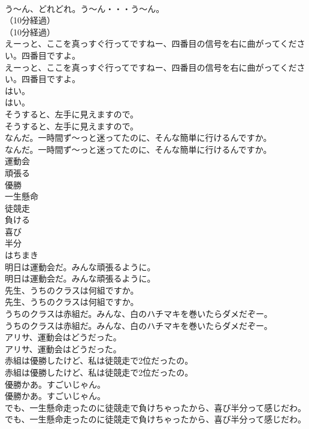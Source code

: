 \documentclass[8pt]{extreport}
\begin{document}
\begin{CJK}{UTF8}{min}
\\	う〜ん、どれどれ。う〜ん・・・う〜ん。 
\\	（10分経過）	
\\	（10分経過） 
\\	えーっと、ここを真っすぐ行ってですねー、四番目の信号を右に曲がってください。四番目ですよ。	
\\	えーっと、ここを真っすぐ行ってですねー、四番目の信号を右に曲がってください。四番目ですよ。 
\\	はい。	
\\	はい。 
\\	そうすると、左手に見えますので。	
\\	そうすると、左手に見えますので。 
\\	なんだ。一時間ず〜っと迷ってたのに、そんな簡単に行けるんですか。	
\\	なんだ。一時間ず〜っと迷ってたのに、そんな簡単に行けるんですか。 
\\	運動会
\\	頑張る
\\	優勝
\\	一生懸命
\\	徒競走
\\	負ける
\\	喜び
\\	半分
\\	はちまき
\\	明日は運動会だ。みんな頑張るように。	
\\	明日は運動会だ。みんな頑張るように。 
\\	先生、うちのクラスは何組ですか。	
\\	先生、うちのクラスは何組ですか。 
\\	うちのクラスは赤組だ。みんな、白のハチマキを巻いたらダメだぞー。	
\\	うちのクラスは赤組だ。みんな、白のハチマキを巻いたらダメだぞー。 
\\	アリサ、運動会はどうだった。	
\\	アリサ、運動会はどうだった。 
\\	赤組は優勝したけど、私は徒競走で2位だったの。	
\\	赤組は優勝したけど、私は徒競走で2位だったの。 
\\	優勝かあ。すごいじゃん。	
\\	優勝かあ。すごいじゃん。 
\\	でも、一生懸命走ったのに徒競走で負けちゃったから、喜び半分って感じだわ。	
\\	でも、一生懸命走ったのに徒競走で負けちゃったから、喜び半分って感じだわ。 

\end{CJK}
\end{document}
